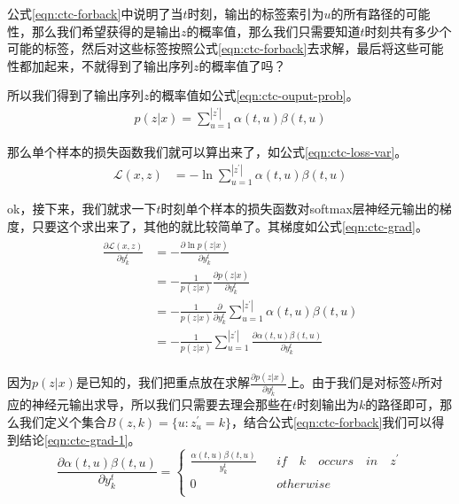 {公式\ref{eqn:ctc-forback}中说明了当$t$时刻，输出的标签索引为$u$的所有路径的可能性，那么我们希望获得的是输出$z$的概率值，那么我们只需要知道$t$时刻共有多少个可能的标签，然后对这些标签按照公式\ref{eqn:ctc-forback}去求解，最后将这些可能性都加起来，不就得到了输出序列$z$的概率值了吗？

所以我们得到了输出序列$z$的概率值如公式\ref{eqn:ctc-ouput-prob}。
\begin{align}
\label{eqn:ctc-ouput-prob}
  p(z|x) = \sum_{u=1}^{|z^{'}|}\alpha(t,u)\beta(t,u)
\end{align}

那么单个样本的损失函数我们就可以算出来了，如公式\ref{eqn:ctc-loss-var}。
\begin{align}
\label{eqn:ctc-loss-var}
 \mathcal{L}(x,z) &= -\ln \sum_{u=1}^{|z^{'}|}\alpha(t,u)\beta(t,u)
\end{align}

ok，接下来，我们就求一下$t$时刻单个样本的损失函数对softmax层神经元输出的梯度，只要这个求出来了，其他的就比较简单了。其梯度如公式\ref{eqn:ctc-grad}。
\begin{align}
\label{eqn:ctc-grad}
\begin{split}
   \frac{\partial{\mathcal{L}(x,z)}}{\partial{y_k^t}} 
            &=  -\frac{\partial{\ln{p(z|x)}}}{\partial{y_k^t}} \\
            &= - \frac{1}{p(z|x)} \frac{\partial{p(z|x)}}{\partial{y_k^t}} \\
            &= - \frac{1}{p(z|x)} \frac{\partial}{\partial{y_k^t}} \sum_{u=1}^{|z^{'}|}\alpha(t,u)\beta(t,u) \\
            &= - \frac{1}{p(z|x)} \sum_{u=1}^{|z^{'}|} \frac{\partial{\alpha(t,u)\beta(t,u)}}{\partial{y_k^t}} 
\end{split}
\end{align}

因为$p(z|x)$是已知的，我们把重点放在求解$\frac{\partial{p(z|x)}}{\partial{y_k^t}}$上。由于我们是对标签$k$所对应的神经元输出求导，所以我们只需要去理会那些在$t$时刻输出为$k$的路径即可，那么我们定义个集合$B(z,k)=\{u:z_u^{'}=k\}$，结合公式\ref{eqn:ctc-forback}我们可以得到结论\ref{eqn:ctc-grad-1}。
\begin{equation}
\label{eqn:ctc-grad-1}
\frac{\partial{\alpha(t,u)\beta(t,u)}}{\partial{y_k^t}} =\left\{
\begin{array}{rcl}
\frac{\alpha(t,u)\beta(t,u)}{y_k^t}& & if\quad k\quad occurs\quad in\quad z^{'}\\
0 & & otherwise\\
\end{array} \right.
\end{equation}

}
